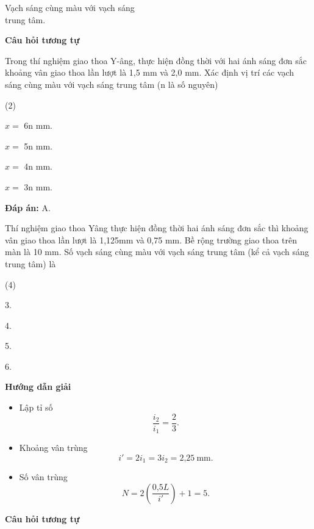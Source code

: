 \begin{dang}{Vạch sáng cùng màu với vạch sáng\\ trung tâm.}
{		\begin{center}
			\textbf{Câu hỏi tương tự}
		\end{center}
		
		Trong thí nghiệm giao thoa Y-âng, thực hiện đồng thời với hai ánh sáng đơn sắc khoảng vân giao thoa lần lượt là 1,5 mm và 2,0 mm. Xác định vị trí các vạch sáng cùng màu với vạch sáng trung tâm (n là số nguyên)
		\begin{mcq}(2)
			\item $x =$ 6n mm. 	
			\item $x =$ 5n mm.   	  
			\item $x =$ 4n mm.          
			\item $x =$ 3n mm. 
		\end{mcq}
		
		\textbf{Đáp án:} A.
	}
	{Thí nghiệm giao thoa Yâng thực hiện đồng thời hai ánh sáng đơn sắc thì khoảng vân giao thoa lần lượt là 1,125mm và 0,75 mm. Bề rộng trường giao thoa trên màn là 10 mm. Số vạch sáng cùng màu với vạch sáng trung tâm (kể cả vạch sáng trung tâm) là
		\begin{mcq}(4)
			\item 3.			
			\item 4.				
			\item 5.				
			\item 6.
		\end{mcq}
	}
	{\begin{center}
			\textbf{Hướng dẫn giải}
		\end{center}
		
		\begin{itemize}
			\item Lập tỉ số
			\begin{equation*}
				\dfrac{i_2}{i_1}=\dfrac{2}{3}.
			\end{equation*}
			\item Khoảng vân trùng
			\begin{equation*}
				i'=2i_1=3i_2= \text{2,25}\ \text{mm}.
			\end{equation*}
			\item Số vân trùng
			\begin{equation*}
				N=2\left(\dfrac{\text{0,5} L}{i'}\right) +1=5.
			\end{equation*}
		\end{itemize}
		
		\begin{center}
			\textbf{Câu hỏi tương tự}
		\end{center}
		
}
\end{dang}
